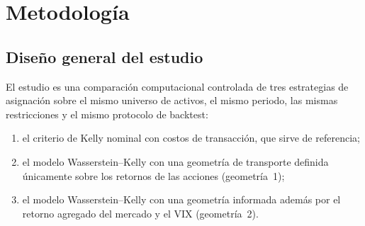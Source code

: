 %

\section{Metodología}\label{sec:metodologia}

\subsection{Diseño general del estudio}\label{sec:diseno}

El estudio es una comparación computacional controlada de tres estrategias de asignación sobre el mismo universo de activos, el mismo periodo, las mismas restricciones y el mismo protocolo de backtest:
\begin{enumerate}[label=(\roman*)]
    \item el criterio de Kelly nominal \citep{kelly1956} con costos de transacción, que sirve de referencia;
    \item el modelo Wasserstein--Kelly con una geometría de transporte definida únicamente sobre los retornos de las acciones (geometría~1);
    \item el modelo Wasserstein--Kelly con una geometría informada además por el retorno agregado del mercado y el VIX (geometría~2).
\end{enumerate}

